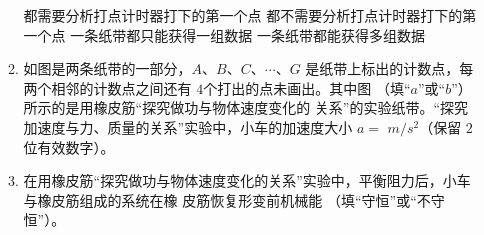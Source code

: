 \begin{enumerate}
\begin{enumerate}
\fourchoices
{都需要分析打点计时器打下的第一个点}
{都不需要分析打点计时器打下的第一个点}
{一条纸带都只能获得一组数据}
{一条纸带都能获得多组数据}


\item 
如图是两条纸带的一部分，$ A $、$ B $、$ C $、$ \cdots $、$ G $ 是纸带上标出的计数点，每两个相邻的计数点之间还有
$ 4 $个打出的点未画出。其中图 \underlinegap （填“$ a $”或“$ b $”）所示的是用橡皮筋“探究做功与物体速度变化的
关系”的实验纸带。“探究加速度与力、质量的关系”实验中，小车的加速度大小 $ a=$ \underlinegap $m/s^{2} $（保留 $ 2 $ 位有效数字）。
\begin{figure}[h!]
\centering
\begin{subfigure}{0.7\linewidth}
\centering
 
\caption{}\label{}
\end{subfigure}
\begin{subfigure}{0.7\linewidth}
\centering
 
\caption{}\label{}
\end{subfigure}

\end{figure}



\item 
在用橡皮筋“探究做功与物体速度变化的关系”实验中，平衡阻力后，小车与橡皮筋组成的系统在橡
皮筋恢复形变前机械能 \underlinegap （填“守恒”或“不守恒”）。


\end{enumerate}





\end{enumerate}
